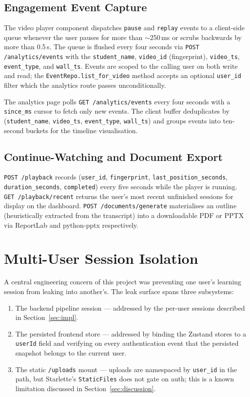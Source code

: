 \documentclass[conference]{IEEEtran}
\begin{document}
\subsection{Engagement Event Capture}

The video player component dispatches \texttt{pause} and \texttt{replay} events to a client-side queue whenever the user pauses for more than $\sim$250\,ms or scrubs backwards by more than 0.5\,s. The queue is flushed every four seconds via \texttt{POST /analytics/events} with the \texttt{student\_name}, \texttt{video\_id} (fingerprint), \texttt{video\_ts}, \texttt{event\_type}, and \texttt{wall\_ts}. Events are scoped to the calling user on both write and read; the \texttt{EventRepo.list\_for\_video} method accepts an optional \texttt{user\_id} filter which the analytics route passes unconditionally.

The analytics page polls \texttt{GET /analytics/events} every four seconds with a \texttt{since\_ms} cursor to fetch only new events. The client buffer deduplicates by (\texttt{student\_name}, \texttt{video\_ts}, \texttt{event\_type}, \texttt{wall\_ts}) and groups events into ten-second buckets for the timeline visualisation.

\subsection{Continue-Watching and Document Export}

\texttt{POST /playback} records (\texttt{user\_id}, \texttt{fingerprint}, \texttt{last\_position\_seconds}, \texttt{duration\_seconds}, \texttt{completed}) every five seconds while the player is running. \texttt{GET /playback/recent} returns the user's most recent unfinished sessions for display on the dashboard. \texttt{POST /documents/generate} materialises an outline (heuristically extracted from the transcript) into a downloadable PDF or PPTX via ReportLab and python-pptx respectively.

\section{Multi-User Session Isolation}\label{sec:isolation}

A central engineering concern of this project was preventing one user's learning session from leaking into another's. The leak surface spans three subsystems:

\begin{enumerate}
    \item The backend pipeline session --- addressed by the per-user sessions described in Section~\ref{sec:impl}.
    \item The persisted frontend store --- addressed by binding the Zustand stores to a \texttt{userId} field and verifying on every authentication event that the persisted snapshot belongs to the current user.
    \item The static \texttt{/uploads} mount --- uploads are namespaced by \texttt{user\_id} in the path, but Starlette's \texttt{StaticFiles} does not gate on auth; this is a known limitation discussed in Section~\ref{sec:discussion}.
\end{enumerate}
\end{document}

